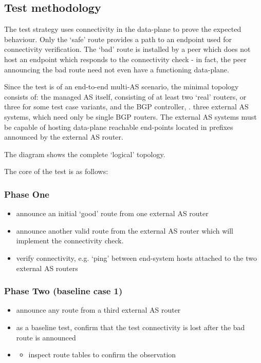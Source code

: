 \subsection{Test methodology}

The test strategy uses connectivity in the data-plane to prove the expected behaviour. 
 Only the `safe' route provides a path to an endpoint used for connectivity verification.
  The `bad' route is installed by a peer which does not host an endpoint which responds to the connectivity check - in fact, the peer announcing the bad route need not even have a functioning data-plane.

Since the test is of an end-to-end multi-AS scenario, the minimal topology consists of:
the managed AS itself, consisting of at least two `real' routers, or three for some test case variants,
and the BGP controller, \hbgp.
three external AS systems, which need only be single BGP routers.  The external AS systems must be capable of hosting data-plane reachable end-points located in prefixes announced by the external AS router.

The diagram shows the complete `logical' topology.


The core of the test is as follows:

\subsubsection{Phase One}
\begin{itemize}
    \item announce an initial `good' route from one external AS router
    \item announce another valid route from the external AS router which will implement the connectivity check.
    \item verify connectivity, e.g. `ping' between end-system hosts attached to the two external AS routers
\end{itemize}

\subsubsection{Phase Two (baseline case 1)}
\begin{itemize}
    \item announce any route from a third external AS router
    \item as a baseline test, confirm that the test connectivity is lost after the bad route is announced
    \item \begin{itemize}
        \item inspect route tables to confirm the observation
    \end{itemize}
\end{itemize}



